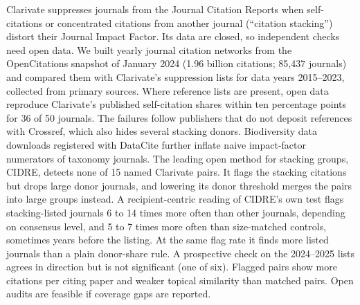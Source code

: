 Clarivate suppresses journals from the Journal Citation Reports when self-citations or concentrated citations from
another journal (``citation stacking'') distort their Journal Impact Factor. Its data are closed, so independent
checks need open data. We built yearly journal citation networks from the OpenCitations snapshot of January 2024
(1.96 billion citations; 85,437 journals) and compared them with Clarivate's suppression lists for data years
2015--2023, collected from primary sources. Where reference lists are present, open data reproduce Clarivate's
published self-citation shares within ten percentage points for 36 of 50 journals. The failures follow publishers
that do not deposit references with Crossref, which also hides several stacking donors. Biodiversity data downloads
registered with DataCite further inflate naive impact-factor numerators of taxonomy journals. The leading open method
for stacking groups, CIDRE, detects none of 15 named Clarivate pairs. It flags the stacking citations but drops large
donor journals, and lowering its donor threshold merges the pairs into large groups instead. A recipient-centric
reading of CIDRE's own test flags stacking-listed journals 6 to 14 times more often than other journals,
depending on consensus level, and 5 to 7 times more often than size-matched controls, sometimes years before the
listing. At the same flag rate it finds more listed journals than a plain donor-share rule. A prospective check on
the 2024--2025 lists agrees in direction but is not significant (one of six). Flagged pairs show more
citations per citing paper and weaker topical similarity than matched pairs. Open audits are feasible if coverage gaps
are reported.
